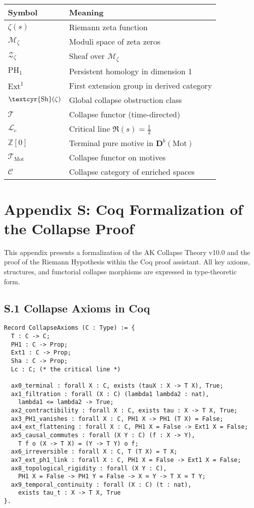 \documentclass[11pt]{article}
\newcommand{\Sha}{\text{\textcyr{Sh}}}
\begin{document}
\begin{tabular}{ll}
\textbf{Symbol} & \textbf{Meaning} \\
\hline
$\zeta(s)$ & Riemann zeta function \\
$\mathcal{M}_\zeta$ & Moduli space of zeta zeros \\
$\mathcal{Z}_\zeta$ & Sheaf over $\mathcal{M}_\zeta$ \\
$\mathrm{PH}_1$ & Persistent homology in dimension 1 \\
$\mathrm{Ext}^1$ & First extension group in derived category \\
$\Sha(\zeta)$ & Global collapse obstruction class \\
$\mathcal{T}$ & Collapse functor (time-directed) \\
$\mathcal{L}_c$ & Critical line $\Re(s) = \tfrac{1}{2}$ \\
$\mathbb{Z}[0]$ & Terminal pure motive in $\mathbf{D}^b(\text{Mot})$ \\
$\mathcal{T}_{\mathrm{Mot}}$ & Collapse functor on motives \\
$\mathcal{C}$ & Collapse category of enriched spaces \\
\end{tabular}



\section*{Appendix S: Coq Formalization of the Collapse Proof}

This appendix presents a formalization of the AK Collapse Theory v10.0 and the proof of the Riemann Hypothesis  
within the Coq proof assistant. All key axioms, structures, and functorial collapse morphisms are expressed in type-theoretic form.

\subsection*{S.1 Collapse Axioms in Coq}

\begin{lstlisting}[caption={Collapse Axioms A0–A9}]
Record CollapseAxioms (C : Type) := {
  T : C -> C;
  PH1 : C -> Prop;
  Ext1 : C -> Prop;
  Sha : C -> Prop;
  Lc : C; (* the critical line *)

  ax0_terminal : forall X : C, exists (tauX : X -> T X), True;
  ax1_filtration : forall (X : C) (lambda1 lambda2 : nat),
    lambda1 <= lambda2 -> True;
  ax2_contractibility : forall X : C, exists tau : X -> T X, True;
  ax3_PH1_vanishes : forall X : C, PH1 X -> PH1 (T X) = False;
  ax4_ext_flattening : forall X : C, PH1 X = False -> Ext1 X = False;
  ax5_causal_commutes : forall (X Y : C) (f : X -> Y),
    T f o (X -> T X) = (Y -> T Y) o f;
  ax6_irreversible : forall X : C, T (T X) = T X;
  ax7_ext_ph1_link : forall X : C, PH1 X = False -> Ext1 X = False;
  ax8_topological_rigidity : forall (X Y : C),
    PH1 X = False -> PH1 Y = False -> X ≃ Y -> T X ≃ T Y;
  ax9_temporal_continuity : forall (X : C) (t : nat),
    exists tau_t : X -> T X, True
}.
\end{lstlisting}
\end{document}
